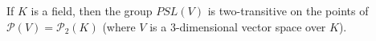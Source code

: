 If $K$ is a field, then the group $PSL(V)$ is two-transitive on the points of $\mathcal{P}(V) = \mathcal{P}_2(K)$ (where $V$ is a 3-dimensional vector space over $K$).
